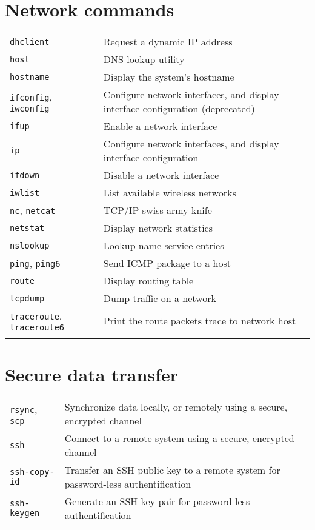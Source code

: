 \documentclass[10pt]{article}
\begin{document}
\begin{multicols}{2}

\section{Network commands}
\begin{tabular}{ p{2.5cm} p{8.5cm} }
  \hline
  \texttt{dhclient} & Request a dynamic IP address \\
  \rowcolor{Gray}
  \texttt{host} & DNS lookup utility \\
  \texttt{hostname} & Display the system's hostname \\
  \rowcolor{Gray}
  \texttt{ifconfig}, \texttt{iwconfig} & Configure network interfaces, and display interface configuration (deprecated)\\
  \texttt{ifup} & Enable a network interface \\
  \rowcolor{Gray}
  \texttt{ip} & Configure network interfaces, and display interface configuration \\
  \texttt{ifdown} & Disable a network interface \\
  \rowcolor{Gray}
  \texttt{iwlist} & List available wireless networks \\
  \texttt{nc}, \texttt{netcat} & TCP/IP swiss army knife \\
  \rowcolor{Gray}
  \texttt{netstat} & Display network statistics \\
  \texttt{nslookup} & Lookup name service entries \\
  \rowcolor{Gray}
  \texttt{ping}, \texttt{ping6} & Send ICMP package to a host \\
  \texttt{route} & Display routing table \\
  \rowcolor{Gray}
  \texttt{tcpdump} & Dump traffic on a network \\
  \texttt{traceroute}, \texttt{traceroute6} & Print the route packets trace to network host\\
  \hline
  & \\
\end{tabular}

\section{Secure data transfer}
\begin{tabular}{ p{2.5cm} p{8.5cm} }
  \hline
  \texttt{rsync}, \texttt{scp} & Synchronize data locally, or remotely \newline using a secure, encrypted channel \\
  \rowcolor{Gray}
  \texttt{ssh} & Connect to a remote system using a \newline secure, encrypted channel\\
  \texttt{ssh-copy-id} & Transfer an SSH public key to a remote system for password-less authentification\\
  \rowcolor{Gray}
  \texttt{ssh-keygen} & Generate an SSH key pair for password-less authentification\\
  \hline
\end{tabular}


\end{multicols}
\end{document}
